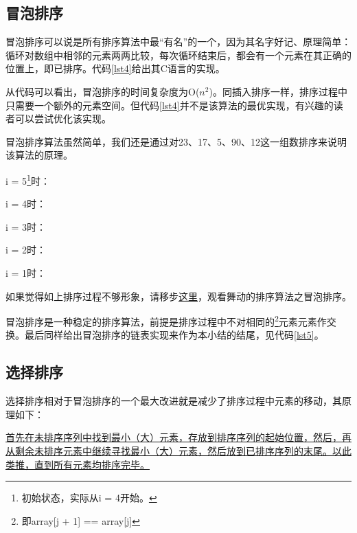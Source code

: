\documentclass[a4paper, 12pt, titlepage]{article}
\begin{document}
\subsection{冒泡排序}
\label{subsec:bubble_sort}

冒泡排序可以说是所有排序算法中最“有名”的一个，因为其名字好记、原理简单：循环对数组中相邻的元素两两比较，每次循环结束后，都会有一个元素在其正确的位置上，即已排序。代码\ref{lst4}给出其C语言的实现。
\begin{spacing}{1.0}
  
\end{spacing}

从代码可以看出，冒泡排序的时间复杂度为O($n^2$)。同插入排序一样，排序过程中只需要一个额外的元素空间。但代码\ref{lst4}并不是该算法的最优实现，有兴趣的读者可以尝试优化该实现。

冒泡排序算法虽然简单，我们还是通过对23、17、5、90、12这一组数排序来说明该算法的原理。

i = 5\footnote{初始状态，实际从i = 4开始。}时：


i = 4时：


i = 3时：


i = 2时：


i = 1时：


如果觉得如上排序过程不够形象，请移步\href{http://v.youku.com/v_show/id_XMzMyOTAyMzQ0.html}{这里}，观看舞动的排序算法之冒泡排序。

冒泡排序是一种稳定的排序算法，前提是排序过程中不对相同的\footnote{即array[j + 1] == array[j]}元素元素作交换。最后同样给出冒泡排序的链表实现来作为本小结的结尾，见代码\ref{lst5}。
\begin{spacing}{1.0}
  
\end{spacing}


\subsection{选择排序}
选择排序相对于冒泡排序的一个最大改进就是减少了排序过程中元素的移动，其原理如下：

\href{http://zh.wikipedia.org/wiki/\%E9\%80\%89\%E6\%8B\%A9\%E6\%8E\%92\%E5\%BA\%8F}{首先在未排序序列中找到最小（大）元素，存放到排序序列的起始位置，然后，再从剩余未排序元素中继续寻找最小（大）元素，然后放到已排序序列的末尾。以此类推，直到所有元素均排序完毕。}
\end{document}
